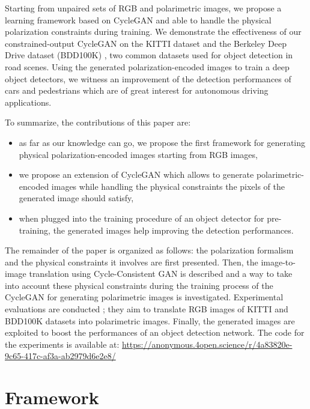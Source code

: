 Starting from unpaired sets of RGB and polarimetric images, we propose a learning framework based on CycleGAN and able to handle the physical polarization constraints during training. We demonstrate the effectiveness of our constrained-output CycleGAN on the KITTI dataset \citep{Geiger2012} and the Berkeley Deep Drive dataset (BDD100K) \cite{Xu2017}, two common datasets used for object detection in road scenes. Using the generated polarization-encoded images to train a deep object detectors, we witness an improvement of the detection performances of cars and pedestrians which are of great interest for autonomous driving applications. 

To summarize, the contributions of this paper are:
\begin{itemize}
	\item as far as our knowledge can go, we propose the first framework for generating physical polarization-encoded images starting from RGB images, 
	\item we propose an extension of CycleGAN which allows to generate polarimetric-encoded images while handling the physical constraints the pixels of the generated image should satisfy,
	\item when plugged into the training procedure of an object detector for pre-training, the generated images help improving the detection performances.
\end{itemize}

The remainder of the paper is organized as follows:  
the polarization formalism and the physical constraints it involves are first presented. Then, the image-to-image translation using Cycle-Consistent GAN is described and a way to take into account these physical constraints during the training process of the CycleGAN for generating polarimetric images is investigated. Experimental evaluations are conducted ; they aim to translate RGB images of KITTI and BDD100K datasets into polarimetric images. Finally, the generated images are exploited to boost the performances of an object detection network. The code for the experiments is available at: \url{https://anonymous.4open.science/r/4a83820e-9c65-417c-af3a-ab2979d6e2e8/}


\section{Framework}

